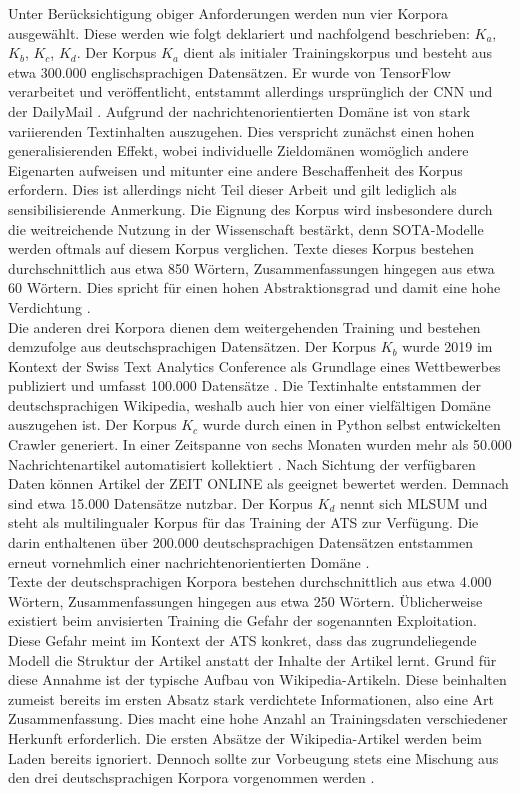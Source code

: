 \noindent
Unter Berücksichtigung obiger Anforderungen werden nun vier Korpora ausgewählt. Diese werden wie folgt deklariert und nachfolgend beschrieben: $K_a$, $K_b$, $K_c$, $K_d$. Der Korpus $K_a$ dient als initialer Trainingskorpus und besteht aus etwa 300.000 englischsprachigen Datensätzen. Er wurde von TensorFlow verarbeitet und veröffentlicht, entstammt allerdings ursprünglich der CNN und der DailyMail \cite{TEN21}. Aufgrund der nachrichtenorientierten Domäne ist von stark variierenden Textinhalten auszugehen. Dies verspricht zunächst einen hohen generalisierenden Effekt, wobei individuelle Zieldomänen womöglich andere Eigenarten aufweisen und mitunter eine andere Beschaffenheit des Korpus erfordern. Dies ist allerdings nicht Teil dieser Arbeit und gilt lediglich als sensibilisierende Anmerkung. Die Eignung des Korpus wird insbesondere durch die weitreichende Nutzung in der Wissenschaft bestärkt, denn \ac{SOTA}-Modelle werden oftmals auf diesem Korpus verglichen. Texte dieses Korpus bestehen durchschnittlich aus etwa 850 Wörtern, Zusammenfassungen hingegen aus etwa 60 Wörtern. Dies spricht für einen hohen Abstraktionsgrad und damit eine hohe Verdichtung \cite[S.~6]{ROT20}.\\

\noindent
Die anderen drei Korpora dienen dem weitergehenden Training und bestehen demzufolge aus deutschsprachigen Datensätzen. Der Korpus $K_b$ wurde 2019 im Kontext der Swiss Text Analytics Conference als Grundlage eines Wettbewerbes publiziert und umfasst 100.000 Datensätze \cite{CIE19}. Die Textinhalte entstammen der deutschsprachigen Wikipedia, weshalb auch hier von einer vielfältigen Domäne auszugehen ist. Der Korpus $K_c$ wurde durch einen in Python selbst entwickelten Crawler generiert. In einer Zeitspanne von sechs Monaten wurden mehr als 50.000 Nachrichtenartikel automatisiert kollektiert \cite[S.~79,~83,~416]{BIR09}. Nach Sichtung der verfügbaren Daten können Artikel der ZEIT ONLINE als geeignet bewertet werden. Demnach sind etwa 15.000 Datensätze nutzbar. Der Korpus $K_d$ nennt sich MLSUM und steht als multilingualer Korpus für das Training der \ac{ATS} zur Verfügung. Die darin enthaltenen über 200.000 deutschsprachigen Datensätzen entstammen erneut vornehmlich einer nachrichtenorientierten Domäne \cite{SCI20}.\\

\noindent
Texte der deutschsprachigen Korpora bestehen durchschnittlich aus etwa 4.000 Wörtern, Zusammenfassungen hingegen aus etwa 250 Wörtern. Üblicherweise existiert beim anvisierten Training die Gefahr der sogenannten Exploitation. Diese Gefahr meint im Kontext der \ac{ATS} konkret, dass das zugrundeliegende Modell die Struktur der Artikel anstatt der Inhalte der Artikel lernt. Grund für diese Annahme ist der typische Aufbau von Wikipedia-Artikeln. Diese beinhalten zumeist bereits im ersten Absatz stark verdichtete Informationen, also eine Art Zusammenfassung. Dies macht eine hohe Anzahl an Trainingsdaten verschiedener Herkunft erforderlich. Die ersten Absätze der Wikipedia-Artikel werden beim Laden bereits ignoriert. Dennoch sollte zur Vorbeugung stets eine Mischung aus den drei deutschsprachigen Korpora vorgenommen werden \cite[S.~42]{BIR09}.
\newpage

